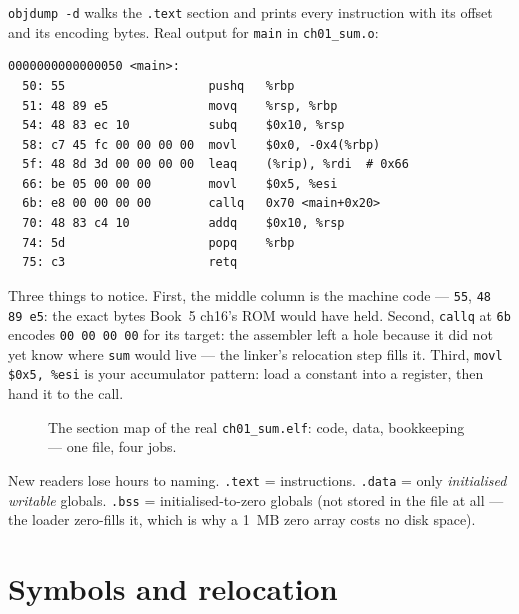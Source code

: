 \begin{example}
\label{ex:disasm}
\texttt{objdump -d} walks the \texttt{.text} section and prints every
instruction with its offset and its encoding bytes. Real output for
\texttt{main} in \texttt{ch01\_sum.o}:

\begin{lstlisting}[basicstyle=\ttfamily\scriptsize]
0000000000000050 <main>:
  50: 55                    pushq   %rbp
  51: 48 89 e5              movq    %rsp, %rbp
  54: 48 83 ec 10           subq    $0x10, %rsp
  58: c7 45 fc 00 00 00 00  movl    $0x0, -0x4(%rbp)
  5f: 48 8d 3d 00 00 00 00  leaq    (%rip), %rdi  # 0x66
  66: be 05 00 00 00        movl    $0x5, %esi
  6b: e8 00 00 00 00        callq   0x70 <main+0x20>
  70: 48 83 c4 10           addq    $0x10, %rsp
  74: 5d                    popq    %rbp
  75: c3                    retq
\end{lstlisting}

Three things to notice. First, the middle column is the machine code ---
\texttt{55}, \texttt{48 89 e5}: the exact bytes Book~5 ch16's ROM would
have held. Second, \texttt{callq} at \texttt{6b} encodes
\texttt{00 00 00 00} for its target: the assembler left a hole because it
did not yet know where \texttt{sum} would live --- the linker's relocation
step fills it. Third, \texttt{movl \$0x5, \%esi} is your accumulator
pattern: load a constant into a register, then hand it to the call.
\end{example}

\begin{figure}[htbp]
\centering

\caption{The section map of the real \texttt{ch01\_sum.elf}: code, data,
bookkeeping --- one file, four jobs.}
\label{fig:elf01}
\end{figure}

\begin{tripwire}
New readers lose hours to naming. \texttt{.text} = instructions.
\texttt{.data} = only \emph{initialised writable} globals.
\texttt{.bss} = initialised-to-zero globals (not stored in the file at
all --- the loader zero-fills it, which is why a 1~MB zero array costs
no disk space).
\end{tripwire}

\section{Symbols and relocation}
\label{sec:sym01}

